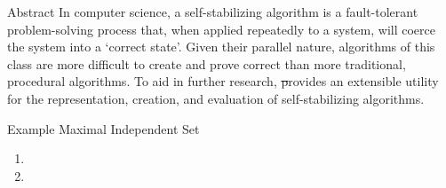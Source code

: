 \documentclass{beamer}
\begin{document}
\begin{frame}[fragile,t]
  \maketitle
  \vspace{1in}
  \begin{columns}[t]
    \begin{column}{.45\textwidth}
      \begin{block}{Abstract}
        In computer science,
            a self-stabilizing algorithm is
            a fault-tolerant problem-solving process that,
            when applied repeatedly to a system,
            will coerce the system into a ‘correct state’.
        Given their parallel nature,
            algorithms of this class are more difficult
            to create and prove correct than
            more traditional, procedural algorithms.
        To aid in further research,
            \st provides an extensible utility for
            the representation, creation, and evaluation
            of self-stabilizing algorithms.
      \end{block}

      \begin{block}{Example \Dash Maximal Independent Set}
        \begin{minipage}[b]{4in}
          \begin{enumerate}
          \item[{\setlength\fboxrule{0pt}\fbox1}]
          \item[{\setlength\fboxrule{0pt}\fbox2}]
\end{enumerate}
\end{minipage}
\end{block}
\end{column}
\end{columns}
\end{frame}
\end{document}
